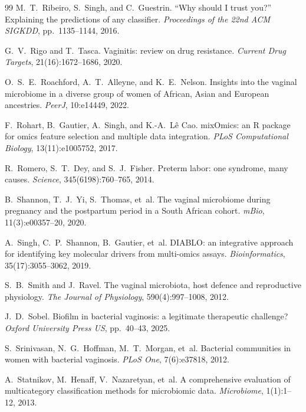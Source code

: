 \documentclass[12pt,a4paper]{report}
\begin{document}
\begin{thebibliography}{99}
M.~T.~Ribeiro, S.~Singh, and C.~Guestrin.
\newblock ``Why should I trust you?'' Explaining the predictions of any classifier.
\newblock \textit{Proceedings of the 22nd ACM SIGKDD}, pp.~1135--1144, 2016.

G.~V.~Rigo and T.~Tasca.
\newblock Vaginitis: review on drug resistance.
\newblock \textit{Current Drug Targets}, 21(16):1672--1686, 2020.

O.~S.~E.~Roachford, A.~T.~Alleyne, and K.~E.~Nelson.
\newblock Insights into the vaginal microbiome in a diverse group of women of African, Asian and European ancestries.
\newblock \textit{PeerJ}, 10:e14449, 2022.

F.~Rohart, B.~Gautier, A.~Singh, and K.-A.~L\^e Cao.
\newblock mixOmics: an R package for omics feature selection and multiple data integration.
\newblock \textit{PLoS Computational Biology}, 13(11):e1005752, 2017.

R.~Romero, S.~T.~Dey, and S.~J.~Fisher.
\newblock Preterm labor: one syndrome, many causes.
\newblock \textit{Science}, 345(6198):760--765, 2014.

B.~Shannon, T.~J.~Yi, S.~Thomas, et~al.
\newblock The vaginal microbiome during pregnancy and the postpartum period in a South African cohort.
\newblock \textit{mBio}, 11(3):e00357--20, 2020.

A.~Singh, C.~P.~Shannon, B.~Gautier, et~al.
\newblock DIABLO: an integrative approach for identifying key molecular drivers from multi-omics assays.
\newblock \textit{Bioinformatics}, 35(17):3055--3062, 2019.

S.~B.~Smith and J.~Ravel.
\newblock The vaginal microbiota, host defence and reproductive physiology.
\newblock \textit{The Journal of Physiology}, 590(4):997--1008, 2012.

J.~D.~Sobel.
\newblock Biofilm in bacterial vaginosis: a legitimate therapeutic challenge?
\newblock \textit{Oxford University Press US}, pp.~40--43, 2025.

S.~Srinivasan, N.~G.~Hoffman, M.~T.~Morgan, et~al.
\newblock Bacterial communities in women with bacterial vaginosis.
\newblock \textit{PLoS One}, 7(6):e37818, 2012.

A.~Statnikov, M.~Henaff, V.~Nazaretyan, et~al.
\newblock A comprehensive evaluation of multicategory classification methods for microbiomic data.
\newblock \textit{Microbiome}, 1(1):1--12, 2013.


\end{thebibliography}
\end{document}
